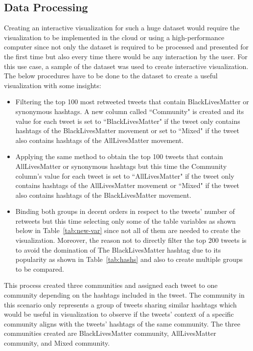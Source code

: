 \subsection{Data Processing}

Creating an interactive visualization for such a huge dataset would require the visualization to be implemented in the cloud or using a high-performance computer since not only the dataset is required to be processed and presented for the first time but also every time there would be any interaction by the user. For this use case, a sample of the dataset was used to create interactive visualization. The below procedures have to be done to the dataset to create a useful visualization with some insights:


\begin{itemize}
    \item Filtering the top 100 most retweeted tweets that contain BlackLivesMatter or synonymous hashtags. A new column called ``Community" is created and its value for each tweet is set to ``BlackLivesMatter" if the tweet only contains hashtags of the BlackLivesMatter movement or set to ``Mixed"  if the tweet also contains hashtags of the AllLivesMatter movement. 
    
    \item Applying the same method to obtain the top 100 tweets that contain AllLivesMatter or synonymous hashtags but this time the Community column's value for each tweet is set to ``AllLivesMatter" if the tweet only contains hashtags of the AllLivesMatter movement or ``Mixed" if the tweet also contains hashtags of the BlackLivesMatter movement. 
    
    \item Binding both groups in decent orders in respect to the tweets' number of retweets but this time selecting only some of the table variables as shown below in Table~\ref{tab:new-var} since not all of them are needed to create the visualization. Moreover, the reason not to directly filter the top 200 tweets is to avoid the domination of The BlackLivesMatter hashtag due to its popularity as shown in Table~\ref{tab:hashs} and also to create multiple groups to be compared. 
    


\end{itemize}

This process created three communities and assigned each tweet to one community depending on the hashtags included in the tweet. The community in this scenario only represents a group of tweets sharing similar hashtags which would be useful in visualization to observe if the tweets' context of a specific community aligns with the tweets' hashtags of the same community. The three communities created are BlackLivesMatter community, AllLivesMatter community, and Mixed community.


